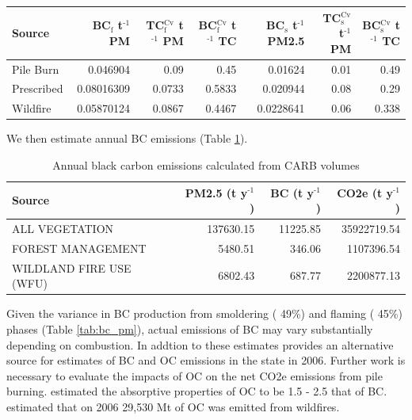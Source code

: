 \documentclass[a4paper]{article}
\begin{document}
\begin{center}
\begin{tabular}{lrrrrrr}
Source & BC\(_{\text{f}}\) t\(^{\text{-1}}\) PM & TC\(_{\text{f}}^{\text{Cv}}\) t\(^{\text{-1}}\) PM & BC\(_{\text{f}}^{\text{Cv}}\) t\(^{\text{-1}}\) TC & BC\(_{\text{s}}\) t\(^{\text{-1}}\) PM2.5 & TC\(_{\text{s}}^{\text{Cv}}\) t\(^{\text{-1}}\) PM & BC\(_{\text{s}}^{\text{Cv}}\) t\(^{\text{-1}}\) TC\\
\hline
Pile Burn & 0.046904 & 0.09 & 0.45 & 0.01624 & 0.01 & 0.49\\
Prescribed & 0.08016309 & 0.0733 & 0.5833 & 0.020944 & 0.08 & 0.29\\
Wildfire & 0.05870124 & 0.0867 & 0.4467 & 0.0228641 & 0.06 & 0.338\\
\end{tabular}

\end{center}



We then estimate annual \ac{BC} emissions (Table \ref{tab:carb_bc}).


\begin{table}[htb]
\centering
\begin{tabular}{lrrr}
Source & PM2.5 (t y\(^{\text{-1}}\)) & BC (t y\(^{\text{-1}}\)) & CO2e (t y\(^{\text{-1}}\))\\
\hline
ALL VEGETATION & 137630.15 & 11225.85 & 35922719.54\\
FOREST MANAGEMENT & 5480.51 & 346.06 & 1107396.54\\
WILDLAND FIRE USE (WFU) & 6802.43 & 687.77 & 2200877.13\\
\end{tabular}
\caption{\label{tab:orgtable1}
Annual black carbon emissions calculated from CARB volumes \label{tab:carb_bc}}

\end{table}




Given the variance in \ac{BC} production from smoldering (\textpm{} 49\%) and flaming (\textpm{} 45\%) phases (Table \ref{tab:bc_pm}), actual emissions of \ac{BC}  may vary substantially depending on combustion. In addtion to these estimates \cite{Chow2010} provides an alternative source for estimates of \ac{BC} and \ac{OC} emissions in the state in 2006. Further work is necessary to evaluate the impacts of \ac{OC} on the net \ac{CO2e} emissions from pile burning. \cite{Pokhrel2016} estimated the absorptive properties of \ac{OC} to be 1.5 - 2.5 that of \ac{BC}. \cite{Chow2010} estimated that on 2006 29,530 Mt of \ac{OC} was emitted from wildfires. 
\end{document}
